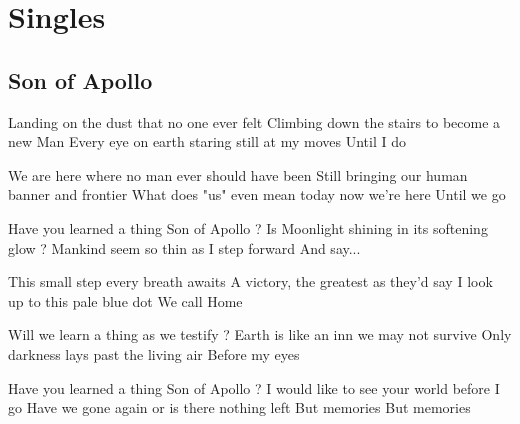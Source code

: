 \documentclass{article}
\newenvironment{album}[1]%
{%
  \section*{#1}
}%
{%
}
\newenvironment{song}[1]%
{%
  \subsection*{\textbf{#1}}
  \begin{multicols*}{2}
}%
{%
  \end{multicols*}
  \newpage
}
\newenvironment{couplet} %
{%
  \verbatim
}%
{% end code
  \endverbatim
}
\newenvironment{refrain} %
{%
  \verbatim
}%
{% end code
  \endverbatim
}
\begin{document}
\begin{album}{Singles}

\begin{song}{Son of Apollo}
\begin{couplet}
Landing on the dust that no one ever felt
Climbing down the stairs to become a new Man
Every eye on earth staring still at my moves
Until I do
\end{couplet}
\begin{couplet}
We are here where no man ever should have been
Still bringing our human banner and frontier
What does "us" even mean today now we're here
Until we go  
\end{couplet}  
\begin{refrain}
Have you learned a thing Son of Apollo ?
Is Moonlight shining in its softening glow ?
Mankind seem so thin as I step forward
And say...  
\end{refrain}
\begin{couplet}
This small step every breath awaits
A victory, the greatest as they'd say
I look up to this pale blue dot
We call Home
\end{couplet}
\begin{refrain}
Will we learn a thing as we testify ?
Earth is like an inn we may not survive
Only darkness lays past the living air
Before my eyes  
\end{refrain}
\begin{refrain}
Have you learned a thing Son of Apollo ?
I would like to see your world before I go
Have we gone again or is there nothing left
But memories
But memories  
\end{refrain}
\end{song}


\end{album}
\end{document}
